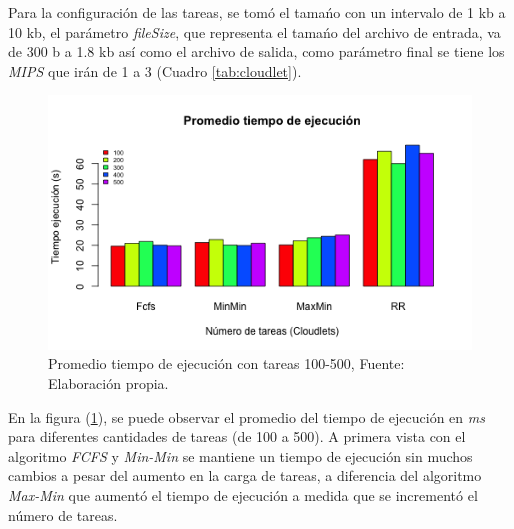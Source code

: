 Para la configuraci\'on de las tareas, se tom\'o el tama\'no con un intervalo de 1 kb a 10 kb,  el par\'ametro \textit{fileSize}, que representa el tama\'no del archivo de entrada, va de 300 b a 1.8 kb as\'i como el archivo de salida, como par\'ametro final se tiene los \textit{MIPS} que ir\'an de 1 a 3 (Cuadro \ref{tab:cloudlet}).



\newpage
\setcounter{figure}{14}
\renewcommand\thefigure{\arabic{figure}}
\begin{figure}[h!] 
	\centering
	\includegraphics[scale=0.5]{media/tiempoejecucion}
	\caption{Promedio tiempo de ejecuci\'on con tareas 100-500, Fuente: Elaboraci\'on propia.}
	\label{fig:tiempo}
\end{figure}



En la figura (\ref{fig:tiempo}), se puede observar el promedio del tiempo de ejecuci\'on en \emph{ms} para diferentes cantidades de tareas (de 100 a 500). A primera vista con el algoritmo \textit{FCFS} y \textit{Min-Min} se mantiene un tiempo de ejecuci\'on sin muchos cambios a pesar del aumento en la carga de tareas, a diferencia del algoritmo \textit{Max-Min} que aument\'o el tiempo de ejecuci\'on a medida que se increment\'o el n\'umero de tareas.


